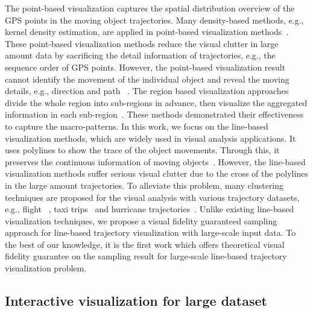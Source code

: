 The point-based visualization captures the spatial distribution overview of the GPS points in the moving object trajectories.
Many density-based methods, e.g., kernel density estimation, are applied in point-based visualization methods~\cite{liu2013vait,yang2016exploring,chae2014public,xie2008kernel, borruso2008network}.
These point-based visualization methods reduce the visual clutter in large amount data by sacrificing the detail information of trajectories, e.g., the sequence order of GPS points.
However, the point-based visualization result cannot identify the movement of the individual object and reveal the moving details, e.g.,  direction and path ~\cite{chen2015survey}.
The region based visualization approaches divide the whole region into sub-regions in advance, then visualize the aggregated information in each sub-region~\cite{guo2009flow,wood2010visualisation,von2015mobilitygraphs}. 
These methods demonstrated their effectiveness to capture the macro-patterns.
In this work, we focus on the line-based visualization methods, which are widely used in visual analysis applications.
It uses polylines to show the trace of the object movements.
Through this, it preserves the continuous information of moving objects~\cite{guo2011tripvista,hurter2009fromdady}.
However, the line-based visualization methods suffer serious visual clutter due to the cross of the polylines in the large amount trajectories.
To alleviate this problem, many clustering techniques are proposed for the visual analysis with various trajectory datasets, e.g., flight ~\cite{ferreira2013vector}, taxi trips~\cite{rinzivillo2008visually} and hurricane trajectories~\cite{andrienko2017clustering}.
Unlike existing line-based visualization techniques, we propose a visual fidelity  guaranteed sampling approach for line-based trajectory visualization with large-scale input data.
To the best of our knowledge, it is the first work which offers theoretical visual fidelity guarantee on the sampling result for large-scale line-based trajectory visualization problem.





\subsection{Interactive visualization for large dataset}\label{sec:interactive}

